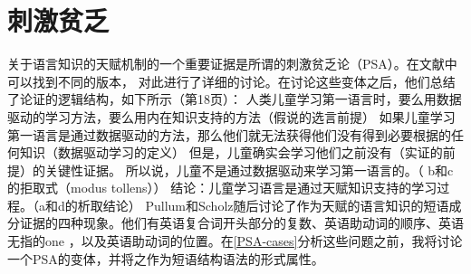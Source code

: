 \section{刺激贫乏}
\label{Abschnitt-PSA}

关于语言知识的天赋机制的一个重要证据是所谓的刺激贫乏论（PSA）\citep[]{Chomsky80b-u}。在文献中可以找到不同的版本， \citet{PS2002a}对此进行了详细的讨论。在讨论这些变体之后，他们总结了论证的逻辑结构，如下所示（第18页）：
\eal
\ex 人类儿童学习第一语言时，要么用数据驱动的学习方法，要么用内在知识支持的方法（假说的选言前提）
\ex 如果儿童学习第一语言是通过数据驱动的方法，那么他们就无法获得他们没有得到必要根据的任何知识（数据驱动学习的定义）
\ex 但是，儿童确实会学习他们之前没有（实证的前提）的关键性证据。
\ex 所以说，儿童不是通过数据驱动来学习第一语言的。（ b和c的拒取式（modus tollens）） 
\ex 结论：儿童学习语言是通过天赋知识支持的学习过程。（a和d的析取结论）
\zl
Pullum和Scholz随后讨论了作为天赋的语言知识的短语成分证据的四种现象。他们有英语复合词开头部分的复数\citep{Gordon86a}、英语助动词的顺序\citep{Kimball73b-u}、英语无指的one\citep{Baker78a-u} ，以及英语助动词的位置\citep[--33]{Chomsky71a-u}。在\ref{PSA-cases}分析这些问题之前，我将讨论一个PSA的变体，并将之作为短语结构语法的形式属性。

